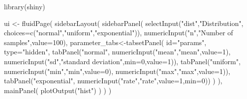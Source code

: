 \documentclass[
]{book}
\newenvironment{Shaded}{\begin{snugshade}}{\end{snugshade}}
\newcommand{\AttributeTok}[1]{\textcolor[rgb]{0.77,0.63,0.00}{#1}}
\newcommand{\DecValTok}[1]{\textcolor[rgb]{0.00,0.00,0.81}{#1}}
\newcommand{\FunctionTok}[1]{\textcolor[rgb]{0.00,0.00,0.00}{#1}}
\newcommand{\NormalTok}[1]{#1}
\newcommand{\OtherTok}[1]{\textcolor[rgb]{0.56,0.35,0.01}{#1}}
\newcommand{\StringTok}[1]{\textcolor[rgb]{0.31,0.60,0.02}{#1}}
\begin{document}
\begin{Shaded}
\begin{Highlighting}[]
\FunctionTok{library}\NormalTok{(shiny)}

\NormalTok{ui }\OtherTok{\textless{}{-}} \FunctionTok{fluidPage}\NormalTok{(}
  \FunctionTok{sidebarLayout}\NormalTok{(}
    \FunctionTok{sidebarPanel}\NormalTok{(}
      \FunctionTok{selectInput}\NormalTok{(}\StringTok{"dist"}\NormalTok{,}\StringTok{"Distribution"}\NormalTok{,}
                  \AttributeTok{choices=}\FunctionTok{c}\NormalTok{(}\StringTok{"normal"}\NormalTok{,}\StringTok{"uniform"}\NormalTok{,}\StringTok{"exponential"}\NormalTok{)),}
      \FunctionTok{numericInput}\NormalTok{(}\StringTok{"n"}\NormalTok{,}\StringTok{"Number of samples"}\NormalTok{,}\AttributeTok{value=}\DecValTok{100}\NormalTok{),}
\NormalTok{      parameter\_tabs}\OtherTok{\textless{}{-}}\FunctionTok{tabsetPanel}\NormalTok{(}
        \AttributeTok{id=}\StringTok{"params"}\NormalTok{,}
        \AttributeTok{type=}\StringTok{"hidden"}\NormalTok{,}
        \FunctionTok{tabPanel}\NormalTok{(}\StringTok{"normal"}\NormalTok{,}
                 \FunctionTok{numericInput}\NormalTok{(}\StringTok{"mean"}\NormalTok{,}\StringTok{"mean"}\NormalTok{,}\AttributeTok{value=}\DecValTok{1}\NormalTok{),}
                 \FunctionTok{numericInput}\NormalTok{(}\StringTok{"sd"}\NormalTok{,}\StringTok{"standard deviation"}\NormalTok{,}\AttributeTok{min=}\DecValTok{0}\NormalTok{,}\AttributeTok{value=}\DecValTok{1}\NormalTok{)),}
        \FunctionTok{tabPanel}\NormalTok{(}\StringTok{"uniform"}\NormalTok{,}
                 \FunctionTok{numericInput}\NormalTok{(}\StringTok{"min"}\NormalTok{,}\StringTok{"min"}\NormalTok{,}\AttributeTok{value=}\DecValTok{0}\NormalTok{),}
                 \FunctionTok{numericInput}\NormalTok{(}\StringTok{"max"}\NormalTok{,}\StringTok{"max"}\NormalTok{,}\AttributeTok{value=}\DecValTok{1}\NormalTok{)),}
        \FunctionTok{tabPanel}\NormalTok{(}\StringTok{"exponential"}\NormalTok{,}
                 \FunctionTok{numericInput}\NormalTok{(}\StringTok{"rate"}\NormalTok{,}\StringTok{"rate"}\NormalTok{,}\AttributeTok{value=}\DecValTok{1}\NormalTok{,}\AttributeTok{min=}\DecValTok{0}\NormalTok{))}
\NormalTok{      )}
\NormalTok{    ),}
    \FunctionTok{mainPanel}\NormalTok{(}
      \FunctionTok{plotOutput}\NormalTok{(}\StringTok{"hist"}\NormalTok{)}
\NormalTok{    )}
\NormalTok{  )}
\NormalTok{)}


\end{Highlighting}
\end{Shaded}
\end{document}
